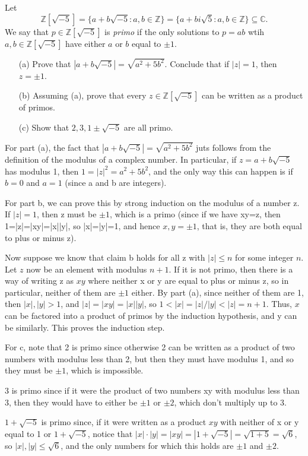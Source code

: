 \documentclass[11pt,dvipsnames]{book}
\def\Z{\mathbb{Z}}
\def\C{{\mathbb{C}}}
\numberwithin{equation}{section} %
\numberwithin{figure}{section} %
\numberwithin{table}{section} %
\begin{document}
\begin{exercise} Let 
\[
\Z[\sqrt{-5}]=\{a+b\sqrt{-5}: a,b\in\Z\} = \{a+bi\sqrt{5}: a,b\in\Z\}\subseteq \C.
\]
We say that $p\in \Z[\sqrt{-5}]$ is {\it primo} if the only solutions to $p=ab$ wtih $a,b\in \Z[\sqrt{-5}]$ have either $a$ or $b$ equal to $\pm 1$. 

\begin{itemize}
\item[(a)] Prove that $|a+b\sqrt{-5}|=\sqrt{a^2+5b^2}$. Conclude that if $|z|=1$, then $z=\pm 1$. 
\item[(b)] Assuming (a), prove that every $z\in\Z[\sqrt{-5}]$ can be written as a product of primos. 
\item[(c)] Show that $2,3,1\pm\sqrt{-5}$ are all primo. 

\end{itemize}

\begin{solution}
For part (a), the fact that $|a+b\sqrt{-5}|=\sqrt{a^{2}+5b^{2}}$ juts follows from the definition of the modulus of a complex number. In particular, if $z=a+b\sqrt{-5}$ has modulus 1, then $1=|z|^{2}=a^{2}+5b^{2}$, and the only way this can happen is if $b=0$ and $a=1$ (since a and b are integers).


For part b, we can prove this by strong induction on the modulus of a number z. If $|z|=1$, then z must be $\pm 1$, which is a primo (since if we have xy=z, then 1=|z|=|xy|=|x||y|, so |x|=|y|=1, and hence $x,y=\pm 1$, that is, they are both equal to plus or minus z).


Now suppose we know that claim b holds for all z with $|z|\leq n$ for some integer $n$. Let $z$ now be an element with modulus $n+1$. If it is not primo, then there is a way of writing z as $xy$ where neither x or y are equal to plus or  minus z, so in particular, neither of them are $\pm 1$ either. By part (a), since neither of them are 1, then $|x|,|y|>1$, and $|z|=|xy|=|x||y|$, so $1<|x|=|z|/|y|<|z|=n+1$. Thus, $x$ can be factored into a product of primos by the induction hypothesis, and y can be similarly. This proves the induction step.


For c, note that 2 is primo since otherwise 2 can be written as a product of two numbers with modulus less than 2, but then they must have modulus 1, and so they must be $\pm1$, which is impossible.


3 is primo since if it were the product of two numbers xy with modulus less than 3, then they would have to either be $\pm 1$ or $\pm 2$, which don't multiply up to 3.


$1+\sqrt{-5}$ is primo since, if it were written as a product $xy$ with neither of x or y equal to 1 or $1+\sqrt{-5}$, notice that $|x|\cdot |y|=|xy|=|1+\sqrt{-5}|=\sqrt{1+5}=\sqrt{6}$, so $|x|,|y|\leq \sqrt{6}$, and the only numbers for which this holds are $\pm 1$ and $\pm 2$.
\end{solution}


\end{exercise}
\end{document}
